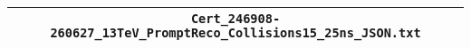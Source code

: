 \begin{center}
\begin{tabular}{c}
\hline\hline
\verb!Cert_246908-260627_13TeV_PromptReco_Collisions15_25ns_JSON.txt!\tabularnewline
\hline
\end{tabular}\end{center}
